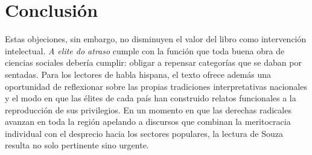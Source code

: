 \section{Conclusión}
Estas objeciones, sin embargo, no disminuyen el valor del libro como intervención intelectual. \textit{A elite do atraso} cumple con la función que toda buena obra de ciencias sociales debería cumplir: obligar a repensar categorías que se daban por sentadas. Para los lectores de habla hispana, el texto ofrece además una oportunidad de reflexionar sobre las propias tradiciones interpretativas nacionales y el modo en que las élites de cada país han construido relatos funcionales a la reproducción de sus privilegios. En un momento en que las derechas radicales avanzan en toda la región apelando a discursos que combinan la meritocracia individual con el desprecio hacia los sectores populares, la lectura de Souza resulta no solo pertinente sino urgente.


